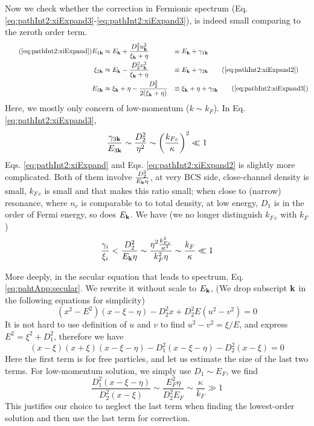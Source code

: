 Now we check whether the correction in Fermionic spectrum (Eq. \ref{eq:pathInt2:xiExpand3}-\ref{eq:pathInt2:xiExpand3}), 
is indeed small comparing to the zeroth order term.  
\begin{align}\tag{\ref{eq:pathInt2:xiExpand}}
E_{1\vk}&\approx{}E_{\vk}+\frac{D_{2}^{2}u_{\vk}^{2}}{\xi_{\vk}+\eta}&\equiv{}&E_{\vk}+\gamma_{1\vk}\\
\xi_{2\vk}&\approx{}E_{\vk}-\frac{D_{2}^{2}v_{\vk}^{2}}{\xi_{\vk}+\eta}&\equiv{}&E_{\vk}+\gamma_{2\vk}
\tag{\ref{eq:pathInt2:xiExpand2}}\\
E_{3\vk}&\approx{}\xi_{\vk}+\eta-\frac{D_{2}^{2}}{2(\xi_{\vk}+\eta)}&\equiv{}&\xi_{\vk}+\eta+\gamma_{3\vk}
\tag{\ref{eq:pathInt2:xiExpand3}}
\end{align}
Here, we mostly only concern of low-momentum ($k\sim{}k_{F}$).  In Eq. \ref{eq:pathInt2:xiExpand3}, 
\begin{equation*}
\frac{\gamma_{3\mathbf{k}}}{E_{3\mathbf{k}}}\sim{}\frac{D_{2}^{2}}{\eta^{2}}\sim\left(\frac{k_{Fc}}{\kappa}\right)^{2}\ll1
\end{equation*}
Eqs. \ref{eq:pathInt2:xiExpand} and Eqs. \ref{eq:pathInt2:xiExpand2} is slightly more complicated.  Both of them involve $\frac{D_{2}^{2}}{E_{\mathbf{k}}\eta}$,  at very BCS side, close-channel density is small, $k_{F\,c}$ is small and that makes this ratio small; when close to (narrow) resonance, where $n_{c}$ is comparable to to total density, at low energy, $D_{1}$ is in the order of Fermi energy, so does $E_{\mathbf{k}}$.   We have (we no longer distinguish $k_{F\,c}$ with $k_{F}$)
 \begin{equation*}
 \frac{\gamma_{i}}{\xi_{i}}<\frac{D_{2}^{2}}{E_{\mathbf{k}}\eta}\sim\frac{\eta^{2}\frac{k_{Fc}^{3}}{\kappa^{3}}}{k_{F}^{2}\eta}\sim\frac{k_{F}}{\kappa}\ll1
\end{equation*}

More deeply, in the secular equation that leads to spectrum, Eq. \ref{eq:pahtApp:secular}.  We rewrite it without scale to $E_{\mathbf{k}}$,  (We drop subscript $\mathbf{k}$ in the following equations for simplicity)
\begin{equation*}
(x^{2}-E^{2})(x-\xi-\eta)-D_{2}^{2}x+D_{2}^{2}E(u^{2}-v^{2})=0
\end{equation*}
It is not hard to use definition of $u$ and $v$ to find $u^{2}-v^{2}=\xi/E$, and express $E^{2}=\xi^{2}+D_{1}^{2}$, therefore we have
\begin{equation*}
(x-\xi)(x+\xi)(x-\xi-\eta)-D_{1}^{2}(x-\xi-\eta)-D_{2}^{2}(x-\xi)=0
\end{equation*}
Here the first term is for free particles, and let us estimate the size of the last two terms.  For low-momentum solution, we simply use $D_{1}\sim{}E_{F}$, we find
\begin{equation*}
\frac{D_{1}^{2}(x-\xi-\eta)}{D_{2}^{2}(x-\xi)}\sim\frac{E_{F}^{2}\eta}{D_{2}^{2}E_{F}}\sim\frac{\kappa}{k_{F}}\gg1
\end{equation*}
This justifies our choice to neglect the last term when finding the lowest-order solution and then use the last term for correction.  

